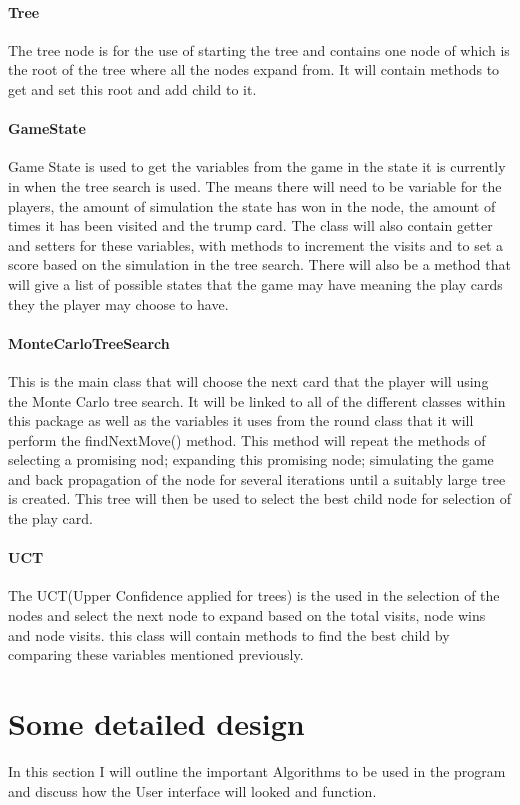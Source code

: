 \paragraph{Tree}
The tree node is for the use of starting the tree and contains one node of which is the root of the tree where all the nodes expand from. It will contain methods to get and set this root and add child to it.
\paragraph{GameState}
Game State is used to get the variables from the game in the state it is currently in when the tree search is used. The means there will need to be variable for the players, the amount of simulation the state has won in the node, the amount of times it has been visited and the trump card. The class will also contain getter and setters for these variables, with methods to increment the visits and to set a score based on the simulation in the tree search. There will also be a method that will give a list of possible states that the game may have meaning the play cards they the player may choose to have.
\paragraph{MonteCarloTreeSearch}
This is the main class that will choose the next card that the player will using the Monte Carlo tree search. It will be linked to all of the different classes within this package as well as the variables it uses from the round class that it will perform the findNextMove() method. This method will repeat the methods of selecting a promising nod; expanding this promising node; simulating the game and back propagation of the node for several iterations until a suitably large tree is created. This tree will then be used to select the best child node for selection of the play card.
\paragraph{UCT}
The UCT(Upper Confidence applied for trees) is the used in the selection of the nodes and select the next node to expand based on the total visits, node wins and node visits. this class will contain methods to find the best child by comparing these variables mentioned previously.
\section{Some detailed design}
In this section I will outline the important Algorithms to be used in the program and discuss how the User interface will looked and function.
